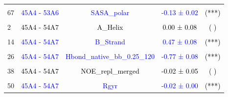 \documentclass{article}\usepackage[table]{xcolor}
\renewcommand{\$}{$} %
\begin{document}
\begin{center}
\begin{longtable}[t]{lcccc}
\cellcolor{gray!6}{61} & \cellcolor{gray!6}{\textcolor{blue}{45A4 - 53A6}} & \cellcolor{gray!6}{\textcolor{blue}{SASA\_nonpolar}} & \cellcolor{gray!6}{\textcolor{blue}{-0.06 ± 0.01}} & \cellcolor{gray!6}{\textcolor{black}{(***)}}\\
67 & \textcolor{blue}{45A4 - 53A6} & \textcolor{blue}{SASA\_polar} & \textcolor{blue}{-0.13 ± 0.02} & \textcolor{black}{(***)}\\
\cellcolor{gray!6}{73} & \cellcolor{gray!6}{\textcolor{black}{45A4 - 53A6}} & \cellcolor{gray!6}{\textcolor{black}{ThreeTen\_Helix}} & \cellcolor{gray!6}{\textcolor{black}{0.08 ± 0.08}} & \cellcolor{gray!6}{\textcolor{black}{( )}}\\
2 & \textcolor{black}{45A4 - 54A7} & \textcolor{black}{A\_Helix} & \textcolor{black}{0.00 ± 0.08} & \textcolor{black}{( )}\\
\cellcolor{gray!6}{8} & \cellcolor{gray!6}{\textcolor{blue}{45A4 - 54A7}} & \cellcolor{gray!6}{\textcolor{blue}{B\_Bridge}} & \cellcolor{gray!6}{\textcolor{blue}{0.16 ± 0.06}} & \cellcolor{gray!6}{\textcolor{black}{(*)}}\\
14 & \textcolor{blue}{45A4 - 54A7} & \textcolor{blue}{B\_Strand} & \textcolor{blue}{0.47 ± 0.08} & \textcolor{black}{(***)}\\
\cellcolor{gray!6}{20} & \cellcolor{gray!6}{\textcolor{blue}{45A4 - 54A7}} & \cellcolor{gray!6}{\textcolor{blue}{Hbond\_bb\_0.25\_120}} & \cellcolor{gray!6}{\textcolor{blue}{-0.51 ± 0.06}} & \cellcolor{gray!6}{\textcolor{black}{(***)}}\\
26 & \textcolor{blue}{45A4 - 54A7} & \textcolor{blue}{Hbond\_native\_bb\_0.25\_120} & \textcolor{blue}{-0.77 ± 0.08} & \textcolor{black}{(***)}\\
\cellcolor{gray!6}{32} & \cellcolor{gray!6}{\textcolor{black}{45A4 - 54A7}} & \cellcolor{gray!6}{\textcolor{black}{Jvalue}} & \cellcolor{gray!6}{\textcolor{black}{0.12 ± 0.09}} & \cellcolor{gray!6}{\textcolor{black}{( )}}\\
38 & \textcolor{black}{45A4 - 54A7} & \textcolor{black}{NOE\_repl\_merged} & \textcolor{black}{-0.02 ± 0.05} & \textcolor{black}{( )}\\
\cellcolor{gray!6}{44} & \cellcolor{gray!6}{\textcolor{black}{45A4 - 54A7}} & \cellcolor{gray!6}{\textcolor{black}{Pi\_Helix}} & \cellcolor{gray!6}{\textcolor{black}{0.12 ± 0.11}} & \cellcolor{gray!6}{\textcolor{black}{( )}}\\
50 & \textcolor{blue}{45A4 - 54A7} & \textcolor{blue}{Rgyr} & \textcolor{blue}{-0.02 ± 0.00} & \textcolor{black}{(***)}\\

\end{longtable}
\end{center}
\end{document}
